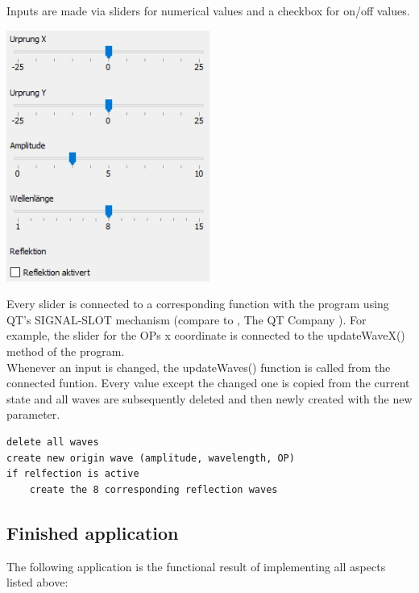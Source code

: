 \documentclass[12pt,a4paper]{scrartcl}
\begin{document}
Inputs are made via sliders for numerical values and a checkbox for on/off values.
\begin{center}
	\includegraphics[width=0.5\textwidth]{Images/Inputs.jpg}
\end{center}

Every slider is connected to a corresponding function with the program using QT's SIGNAL-SLOT mechanism (compare to , The QT Company ). For example, the slider for the OPs x coordinate is connected to the updateWaveX() method of the program.\\
Whenever an input is changed, the updateWaves() function is called from the connected funtion. Every value except the changed one is copied from the current state and all waves are subsequently deleted and then newly created with the new parameter.

\begin{lstlisting}[language=PSEUDO]
delete all waves
create new origin wave (amplitude, wavelength, OP)
if relfection is active
	create the 8 corresponding reflection waves
\end{lstlisting}

\subsection{Finished application}
The following application is the functional result of implementing all aspects listed above:
\end{document}

